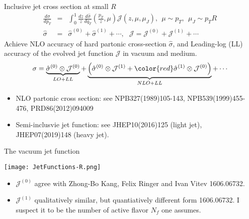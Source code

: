 \documentclass[10pt, aspectratio=1610]{beamer}
\begin{document}

\begin{frame}{Inclusive jet cross section at small $R$}
\begin{eqnarray}
\frac{d\sigma}{dp_T} &=& \int_0^1 \frac{dz}{z} \frac{d\hat{\sigma}}{dq_T}(\frac{p_T}{z}, \mu) \mathcal{J}(z,\mu, \mu_J),~~\mu\sim p_T,~~\mu_J\sim p_T R\\
\hat{\sigma} &=& \hat{\sigma}^{(0)} + \hat{\sigma}^{(1)} + \cdots,~~~\mathcal{J} = \mathcal{J}^{(0)} + \mathcal{J}^{(1)} + \cdots
\end{eqnarray}
Achieve NLO accuracy of hard partonic cross-section $\hat{\sigma}$, and Leading-log (LL) accuracy of the evolved jet function $\mathcal{J}$ in vacuum and medium.
\begin{eqnarray}
\sigma = \underbrace{\hat{\sigma}^{(0)} \otimes \mathcal{J}^{(0)}}_{LO+LL}  +  \underbrace{\left(\hat{\sigma}^{(0)} \otimes \mathcal{J}^{(1)} + {\color{red}\hat{\sigma}^{(1)}} \otimes \mathcal{J}^{(0)}
\right)}_{NLO+LL} + \cdots
\end{eqnarray}
\begin{itemize}
\item NLO partonic cross section: see NPB327(1989)105-143, NPB539(1999)455-476, PRD86(2012)094009
\item Semi-inclusvie jet function: see JHEP10(2016)125 (light jet), JHEP07(2019)148 (heavy jet).
\end{itemize}
\end{frame}


\begin{frame}{The vacuum jet function}

\begin{center}
\texttt{[image: JetFunctions-R.png]}
\end{center}

\begin{itemize}
\item $\mathcal{J}^{(0)}$ agree with Zhong-Bo Kang, Felix Ringer and Ivan Vitev 1606.06732.
\item  $\mathcal{J}^{(1)}$ qualitatively similar, but quantiatively different form 1606.06732. I suspect it to be the number of active flavor $N_f$ one assumes.
\end{itemize}

\end{frame}
\end{document}
